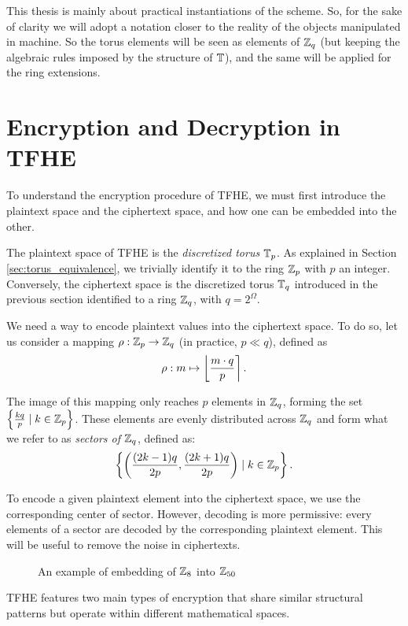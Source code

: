 This thesis is mainly about practical instantiations of the scheme. So, for the sake of clarity we will adopt a notation closer to the reality of the objects manipulated in machine. So the torus elements will be seen as elements of $\mathbb{Z}_q$ (but keeping the algebraic rules imposed by the structure of $\mathbb{T}$), and the same will be applied for the ring extensions. 



\section{Encryption and Decryption in TFHE}

To understand the encryption procedure of TFHE, we must first introduce the plaintext space and the ciphertext space, and how one can be embedded into the other.

The plaintext space of TFHE is the \textit{discretized torus} $\mathbb{T}_p$. As explained in Section \ref{sec:torus_equivalence}, we trivially identify it to the ring $\mathbb{Z}_p$ with $p$ an integer. Conversely, the ciphertext space is the discretized torus $\mathbb{T}_q$ introduced in the previous section identified to a ring $\mathbb{Z}_q$, with $q = 2^\Omega$. 


We need a way to encode plaintext values into the ciphertext space. To do so, let us consider a mapping $\rho: \mathbb{Z}_p \rightarrow \mathbb{Z}_q$ (in practice, $p \ll q$), defined as \[
\rho: m  \mapsto \left \lfloor \frac{m \cdot q} {p} \right \rceil.
\]


The image of this mapping only reaches $p$ elements in $\mathbb{Z}_q$, forming the set $\left \{ \frac {k q}{p} \mid k \in \mathbb{Z}_p \right \}$. These elements are evenly distributed across $\mathbb{Z}_q$ and form what we refer to as \emph{sectors of $\mathbb{Z}_q$}, defined as: \[
\left \{ \left ( \frac{(2 k - 1)q}{2p}, \frac{(2k + 1)q}{2p} \right ) \mid k \in \mathbb{Z}_p \right \}.
\]

To encode a given plaintext element into the ciphertext space, we use the corresponding center of sector. However, decoding is more permissive: every elements of a sector are decoded by the corresponding plaintext element. This will be useful to remove the noise in ciphertexts.

\begin{figure}[htbp]
	\centering
	\caption{An example of embedding of $\mathbb{Z}_8$ into $\mathbb{Z}_{50}$}
\end{figure}


TFHE features two main types of encryption that share similar structural patterns but operate within different mathematical spaces.


